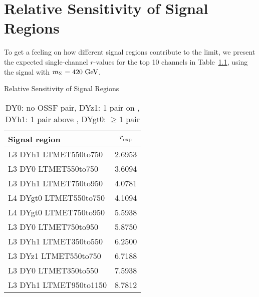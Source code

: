 \chapter{Relative Sensitivity of Signal Regions}
To get a feeling on how different signal regions contribute to the limit, we present the expected single-channel $r$-values for the top 10 channels in Table~\ref{tab:topSensitivity}, using the signal with $m_\Sigma = 420\,\,\text{Ge\hspace{-.08em}V}$.

\begin{table}[h]
\centering
\caption{Relative Sensitivity of Signal Regions} \label{tab:topSensitivity}
\caption*{DY0: no OSSF pair, DYz1: 1 pair on \Z,\\ DYh1: 1 pair above \Z, DYgt0: $\geq 1$ pair}
\begin{tabular}{l c}
\hline\hline
Signal region & $r_\textrm{exp}$\\
\hline
L3 DYh1 LTMET550to750 & 2.6953\\
L3 DY0 LTMET550to750 & 3.6094\\
L3 DYh1 LTMET750to950 & 4.0781\\
L4 DYgt0 LTMET550to750 & 4.1094\\
L4 DYgt0 LTMET750to950 & 5.5938\\
\hline
L3 DY0 LTMET750to950 & 5.8750\\
L3 DYh1 LTMET350to550 & 6.2500\\
L3 DYz1 LTMET550to750 & 6.7188\\
L3 DY0 LTMET350to550 & 7.5938\\
L3 DYh1 LTMET950to1150 & 8.7812\\
\end{tabular}
\end{table}
